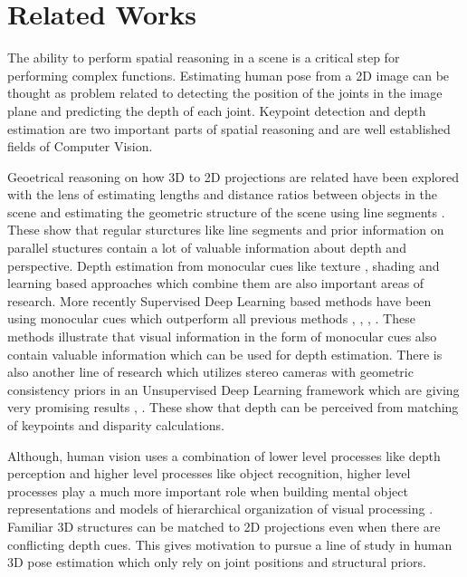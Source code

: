 
\chapter{Related Works}\label{chapter:relatedworks}

The ability to perform spatial reasoning in a scene is a critical step for performing complex functions. Estimating human pose from a 2D image can be thought as problem related to detecting the position of the joints in the image plane and predicting the depth of each joint. Keypoint detection and depth estimation are two important parts of spatial reasoning and are well established fields of Computer Vision. 

Geoetrical reasoning on how 3D to 2D projections are related have been explored with the lens of estimating lengths and distance ratios between objects in the scene \parencite{criminisi2000single} and estimating the geometric structure of the scene using line segments \parencite{lee2009geometric}. These show that regular sturctures like line segments and prior information on parallel stuctures contain a lot of valuable information about depth and perspective. Depth estimation from monocular cues like texture \parencite{lindeberg1993shape}, shading \parencite{zhang1999shape} and learning based approaches which combine them \parencite{saxena2006learning} are also important areas of research. More recently Supervised Deep Learning based methods have been using monocular cues which outperform all previous methods \parencite{eigen2014depth}, \parencite{eigen2015predicting}, \parencite{liu2015deep}, \parencite{liu2016learning}. These methods illustrate that visual information in the form of monocular cues also contain valuable information which can be used for depth estimation. There is also another line of research which utilizes stereo cameras with geometric consistency priors in an Unsupervised Deep Learning framework which are giving very promising results \parencite{garg2016unsupervised}, \parencite{godard2017unsupervised}. These show that depth can be perceived from matching of keypoints and disparity calculations. 

Although, human vision uses a combination of lower level processes like depth perception and higher level processes like object recognition, higher level processes play a much more important role when building mental object representations and models of hierarchical organization of visual processing \parencite{bulthoff1998top}. Familiar 3D structures can be matched to 2D projections even when there are conflicting depth cues. This gives motivation to pursue a line of study in human 3D pose estimation which only rely on joint positions and structural priors. 

